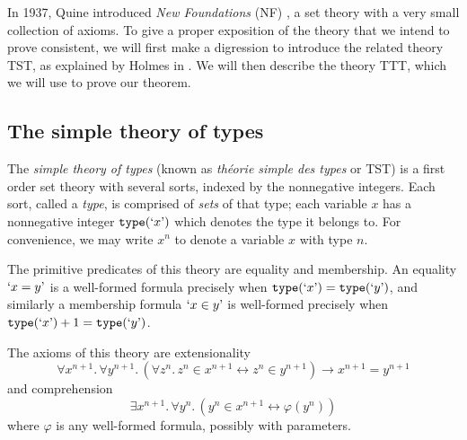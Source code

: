 
In 1937, Quine introduced \emph{New Foundations} (NF) \cite{quine-nf}, a set theory with a very small collection of axioms.
To give a proper exposition of the theory that we intend to prove consistent, we will first make a digression to introduce the related theory TST, as explained by Holmes in \cite{holmes2023nf}.
We will then describe the theory TTT, which we will use to prove our theorem.

\subsection{The simple theory of types}

The \emph{simple theory of types} (known as \emph{théorie simple des types} or TST) is a first order set theory with several sorts, indexed by the nonnegative integers.
Each sort, called a \emph{type}, is comprised of \emph{sets} of that type; each variable \( x \) has a nonnegative integer \( \texttt{type}(\text{`}x\text{'}) \) which denotes the type it belongs to.
For convenience, we may write \( x^n \) to denote a variable \( x \) with type \( n \).

The primitive predicates of this theory are equality and membership.
An equality \( \text{`}x = y\text{'} \) is a well-formed formula precisely when \( \texttt{type}(\text{`}x\text{'}) = \texttt{type}(\text{`}y\text{'}) \), and similarly a membership formula \( \text{`}x \in y\text{'} \) is well-formed precisely when \( \texttt{type}(\text{`}x\text{'}) + 1 = \texttt{type}(\text{`}y\text{'}) \).

The axioms of this theory are extensionality
\[ \forall x^{n + 1}.\, \forall y^{n + 1}.\, (\forall z^n.\, z^n \in x^{n+1} \leftrightarrow z^n \in y^{n+1}) \to x^{n+1} = y^{n+1} \]
and comprehension
\[ \exists x^{n + 1}.\, \forall y^n.\, (y^n \in x^{n+1} \leftrightarrow \varphi(y^n)) \]
where \( \varphi \) is any well-formed formula, possibly with parameters.

